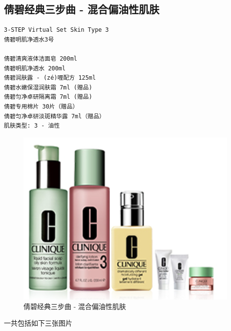 \subsection{倩碧经典三步曲 - 混合偏油性肌肤}
\begin{verbatim}
3-STEP Virtual Set Skin Type 3
倩碧明肌净透水3号

倩碧清爽液体洁面皂 200ml
倩碧明肌净透水 200ml
倩碧润肤露 - (zé)喱配方 125ml
倩碧水嫩保湿润肤霜 7ml (赠品)
倩碧匀净卓研隔离霜 7ml (赠品)
倩碧专用棉片 30片（赠品）
倩碧匀净卓研淡斑精华露 7ml（赠品）
肌肤类型: 3 - 油性
\end{verbatim}

\begin{figure}[htbp]
\begin{minipage}{.8\linewidth}
\centering\includegraphics[width=.9\linewidth]{figures/hua-1.png}
\caption{倩碧经典三步曲 - 混合偏油性肌肤}
\end{minipage}
\end{figure} 
一共包括如下三张图片
